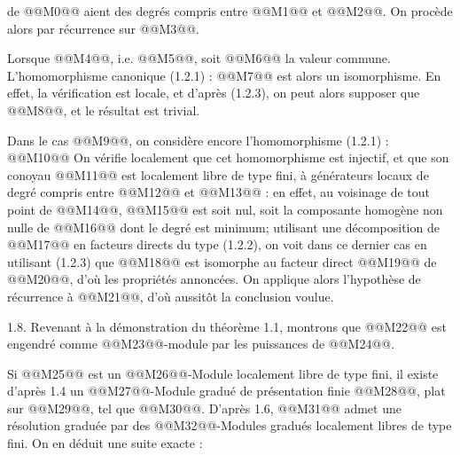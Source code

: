 
de @@M0@@
aient des degrés compris entre @@M1@@ et @@M2@@. On procède alors par récurrence sur @@M3@@.

Lorsque @@M4@@, i.e. @@M5@@, soit @@M6@@ la valeur commune. L'homomorphisme canonique (1.2.1) :
@@M7@@
est alors un isomorphisme. En effet, la vérification est locale, et d'après (1.2.3), on peut alors supposer que @@M8@@, et le résultat est trivial.

Dans le cas @@M9@@, on considère encore l'homomorphisme (1.2.1) :
@@M10@@
On vérifie localement que cet homomorphisme est injectif, et que son conoyau @@M11@@ est localement libre de type fini, à générateurs locaux de degré compris entre @@M12@@ et @@M13@@ : en effet, au voisinage de tout point de @@M14@@, @@M15@@ est soit nul, soit la composante homogène non nulle de @@M16@@ dont le degré est minimum; utilisant une décomposition de @@M17@@ en facteurs directs du type (1.2.2), on voit dans ce dernier cas en utilisant (1.2.3) que @@M18@@ est isomorphe au facteur direct @@M19@@ de @@M20@@, d'où les propriétés annoncées. On applique alors l'hypothèse de récurrence à @@M21@@, d'où aussitôt la conclusion voulue.

1.8. Revenant à la démonstration du théorème 1.1, montrons que @@M22@@ est engendré comme @@M23@@-module par les puissances de @@M24@@.

Si @@M25@@ est un @@M26@@-Module localement libre de type fini, il existe d'après 1.4 un @@M27@@-Module gradué de présentation finie @@M28@@, plat sur @@M29@@, tel que @@M30@@. D'après 1.6, @@M31@@ admet une résolution graduée par des @@M32@@-Modules gradués localement libres de type fini. On en déduit une
suite exacte :
